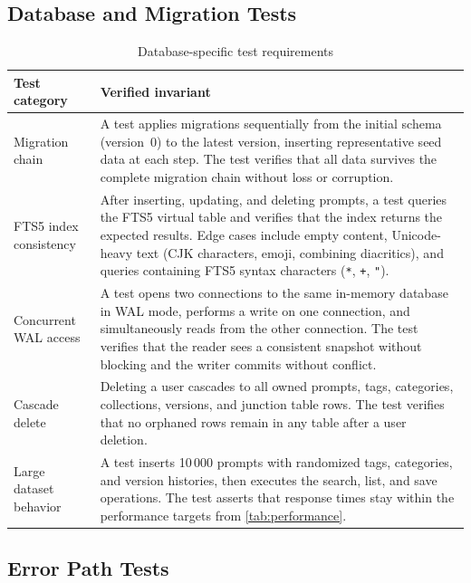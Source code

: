 \documentclass[a4paper, 11pt, oneside]{report}
\begin{document}
\subsection{Database and Migration Tests}
\label{sec:migration-tests}

\begin{table}[H]
  \centering
  \caption{Database-specific test requirements}
  \label{tab:db-tests}
  \begin{tabularx}{\textwidth}{l X}
    \toprule
    \textbf{Test category} & \textbf{Verified invariant} \\
    \midrule
    Migration chain &
      A test applies migrations sequentially from the initial schema
      (version~0) to the latest version, inserting representative
      seed data at each step.  The test verifies that all data
      survives the complete migration chain without loss or
      corruption. \\
    FTS5 index consistency &
      After inserting, updating, and deleting prompts, a test
      queries the FTS5 virtual table and verifies that the index
      returns the expected results.  Edge cases include empty
      content, Unicode-heavy text (CJK characters, emoji,
      combining diacritics), and queries containing FTS5 syntax
      characters (\texttt{*}, \texttt{+}, \texttt{"}). \\
    Concurrent WAL access &
      A test opens two connections to the same in-memory database
      in WAL mode, performs a write on one connection, and
      simultaneously reads from the other connection.  The test
      verifies that the reader sees a consistent snapshot without
      blocking and the writer commits without conflict. \\
    Cascade delete &
      Deleting a user cascades to all owned prompts, tags,
      categories, collections, versions, and junction table rows.
      The test verifies that no orphaned rows remain in any
      table after a user deletion. \\
    Large dataset behavior &
      A test inserts 10\,000 prompts with randomized tags,
      categories, and version histories, then executes the search,
      list, and save operations.  The test asserts that response
      times stay within the performance targets from
      \cref{tab:performance}. \\
    \bottomrule
  \end{tabularx}
\end{table}

\subsection{Error Path Tests}
\label{sec:error-path-tests}
\end{document}

